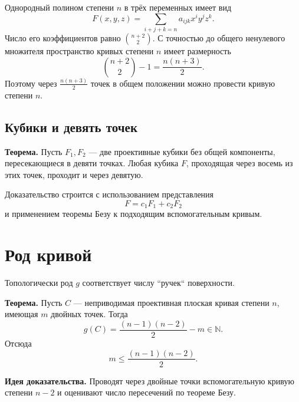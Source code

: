 \documentclass[12pt,a4paper]{article}
\begin{document}
Однородный полином степени $n$ в трёх переменных имеет вид
\[
F(x,y,z)=\sum_{i+j+k=n}a_{ijk}x^iy^jz^k.
\]
Число его коэффициентов равно $\binom{n+2}{2}$. С точностью до общего ненулевого множителя пространство кривых степени $n$ имеет размерность
\[
\binom{n+2}{2}-1=\frac{n(n+3)}2.
\]
Поэтому через $\frac{n(n+3)}2$ точек в общем положении можно провести кривую степени $n$.

\subsection*{Кубики и девять точек}
\textbf{Теорема.} Пусть $F_1,F_2$ --- две проективные кубики без общей компоненты, пересекающиеся в девяти точках. Любая кубика $F$, проходящая через восемь из этих точек, проходит и через девятую.

Доказательство строится с использованием представления
\[
F=c_1F_1+c_2F_2
\]
и применением теоремы Безу к подходящим вспомогательным кривым.

\section{Род кривой}
Топологически род $g$ соответствует числу ``ручек`` поверхности.

\textbf{Теорема.} Пусть $C$ --- неприводимая проективная плоская кривая степени $n$, имеющая $m$ двойных точек. Тогда
\[
g(C)=\frac{(n-1)(n-2)}2-m\in\mathbb N.
\]
Отсюда
\[
m\le \frac{(n-1)(n-2)}2.
\]

\textbf{Идея доказательства.} Проводят через двойные точки вспомогательную кривую степени $n-2$ и оценивают число пересечений по теореме Безу.
\end{document}
